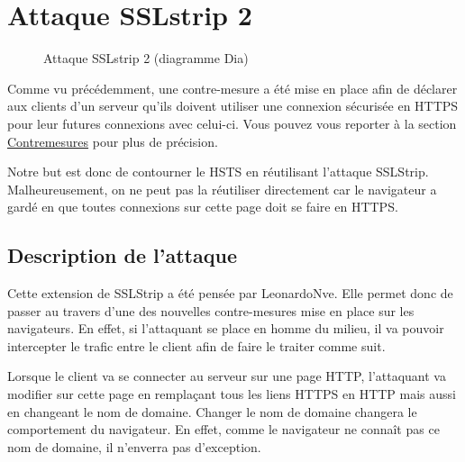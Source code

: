 \chapter{Attaque SSLstrip 2}

\label{sec:sslstrip2}

\begin{figure}[H]
  \caption{Attaque SSLstrip 2 (diagramme Dia)}
\end{figure}

Comme vu précédemment, une contre-mesure a été mise en place afin de déclarer aux clients d'un serveur qu'ils doivent utiliser une connexion sécurisée en HTTPS pour leur futures connexions avec celui-ci. Vous pouvez vous reporter à la section \hyperref[sec:hsts]{Contremesures} pour plus de précision.

Notre but est donc de contourner le HSTS en réutilisant l'attaque SSLStrip. Malheureusement, on ne peut pas la réutiliser directement car le navigateur a gardé en que toutes connexions sur cette page doit se faire en HTTPS.

\section{Description de l'attaque}
Cette extension de SSLStrip a été pensée par LeonardoNve. Elle permet donc de passer au travers d'une des nouvelles contre-mesures mise en place sur les navigateurs. En effet, si l'attaquant se place en homme du milieu, il va pouvoir intercepter le trafic entre le client afin de faire le traiter comme suit.

Lorsque le client va se connecter au serveur sur une page HTTP, l'attaquant va modifier sur cette page en remplaçant tous les liens HTTPS en HTTP mais aussi en changeant le nom de domaine. Changer le nom de domaine changera le comportement du navigateur. En effet, comme le navigateur ne connaît pas ce nom de domaine, il n'enverra pas d'exception.

